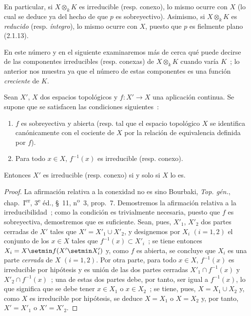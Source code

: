 \begin{env}[4.4.1]
En particular, si $X\otimes_k K$ es irreducible (resp. conexo), lo mismo ocurre
con $X$ (lo cual se deduce ya del hecho de que $p$ es sobreyectivo). Asimismo,
si $X\otimes_k K$ es \emph{reducido} (resp. \emph{íntegro}), lo mismo ocurre con
$X$, puesto que $p$ es fielmente plano (2.1.13).

En este número y en el siguiente examinaremos más de cerca qué puede decirse de
las componentes irreducibles (resp. conexas) de $X\otimes_k K$ cuando varía
$K$~; lo anterior nos muestra ya que el número de estas componentes es una función
\emph{creciente} de $K$.
\end{env}

\begin{lemma}[4.4.2]
Sean $X'$, $X$ dos espacios topológicos y $f:X'\to X$ una aplicación continua.
Se supone que se satisfacen las condiciones siguientes~:
\begin{enumerate}
\item[\textup{(i)}] $f$ es sobreyectiva y abierta \textup{(resp.} tal que el espacio topológico
$X$ se identifica canónicamente con el cociente de $X$ por la relación de
equivalencia definida por $f$\textup{)}.


\item[\textup{(ii)}] Para todo $x\in X$, $f^{-1}(x)$ es irreducible \textup{(resp.} conexo\textup{)}.
\end{enumerate}
Entonces $X'$ es irreducible \textup{(resp.} conexo\textup{)} si y solo si $X$ lo es.
\end{lemma}

\begin{proof}
La afirmación relativa a la conexidad no es sino Bourbaki,
\emph{Top. gén.}, chap.~I\textsuperscript{er}, 3\textsuperscript{e} éd.,
\S~11, n\textsuperscript{o}~3, prop.~7. Demostremos la afirmación relativa a
la irreducibilidad~; como la condición es trivialmente necesaria, puesto que
$f$ es sobreyectiva, demostremos que es suficiente. Sean, pues, $X'_1$, $X'_2$
dos partes cerradas de $X'$ tales que $X'=X'_1\cup X'_2$, y designemos por
$X_i$ $(i=1,2)$ el conjunto de los $x\in X$ tales que
$f^{-1}(x)\subset X'_i$~; se tiene entonces $X_i=X\setmin f(X'\setmin X'_i)$ y, como $f$ es
abierta, se concluye que $X_i$ es una parte \emph{cerrada} de $X$ $(i=1,2)$.
Por otra parte, para todo $x\in X$, $f^{-1}(x)$ es irreducible por hipótesis y
es unión de las dos partes cerradas $X'_1\cap f^{-1}(x)$ y
$X'_2\cap f^{-1}(x)$~; una de estas dos partes debe, por tanto, ser igual a
$f^{-1}(x)$, lo que significa que se debe tener $x\in X_1$ o $x\in X_2$~; se
tiene, pues, $X=X_1\cup X_2$ y, como $X$ es irreducible por hipótesis, se deduce
$X=X_1$ o $X=X_2$ y, por tanto, $X'=X'_1$ o $X'=X'_2$.
\end{proof}

